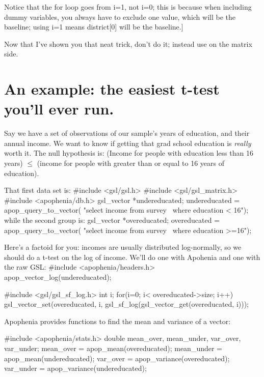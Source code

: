 Notice that the for loop goes from i=1, not i=0; this is because when including
dummy variables, you always have to exclude one value, which will be the baseline;
using i=1 means district[0] will be the baseline.]

Now that I've shown you that neat trick, don't do it; instead use
 on the matrix side.

\section{An example: the easiest t-test you'll ever run.}
Say we have a set of observations of our sample's years of education, and their annual income. We want to
know if getting that grad school education is {\it really} worth it. The null hypothesis is: (Income for
people with education less than 16 years) $\leq$ (income for people with greater than or equal to 16 years
of education).

That first data set is:
#include <gsl/gsl.h>
#include <gsl/gsl_matrix.h>
#include <apophenia/db.h>
gsl_vector	*undereducated;
   undereducated = apop_query_to_vector(
      "select income from survey \
      where education < 16");
while the second group is:
gsl_vector	*overeducated;
   overeducated = apop_query_to_vector(
      "select income from survey \
      where education >=16");

Here's a factoid for you: incomes are usually distributed log-normally, so we should do a t-test on the
log of income. We'll do one with Apohenia and one with the raw GSL:
#include <apophenia/headers.h>
apop_vector_log(undereducated);

#include <gsl/gsl_sf_log.h>
int i;
for(i=0; i< overeducated->size; i++)
   gsl_vector_set(overeducated, i, 
               gsl_sf_log(gsl_vector_get(overeducated, i)));

Apophenia provides functions to find the mean and variance of a vector:

#include <apophenia/stats.h>
double	mean_over, mean_under, var_over, var_under;
mean_over  = apop_mean(overeducated);
mean_under = apop_mean(undereducated);
var_over   = apop_variance(overeducated);
var_under  = apop_variance(undereducated);

